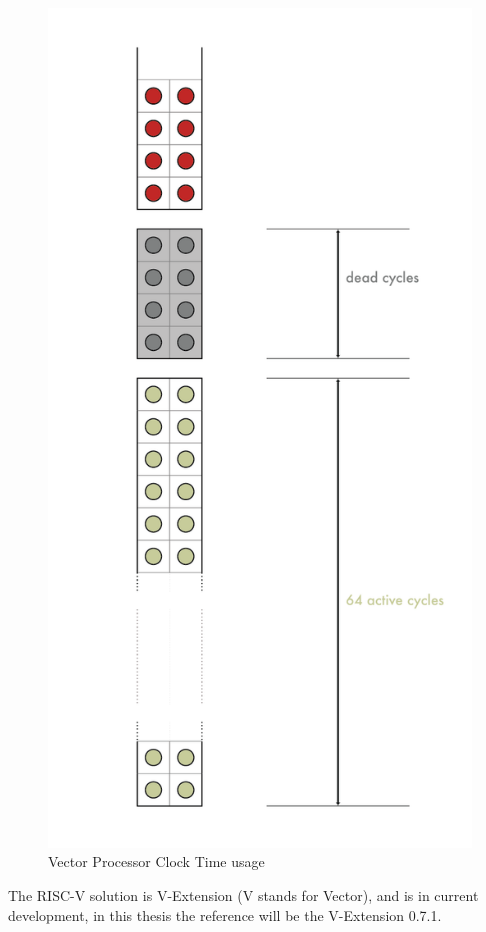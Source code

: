 \begin{figure}[H]
    \centering
    \includegraphics[scale = 0.35]{Chapter_1/img/time-usage.png}
    \caption{Vector Processor Clock Time usage \cite{L15-Krste}}
    \label{Vectoring}
\end{figure}
The RISC-V solution is V-Extension (V stands for Vector), and is in current development, in this thesis the reference will be the V-Extension 0.7.1.

